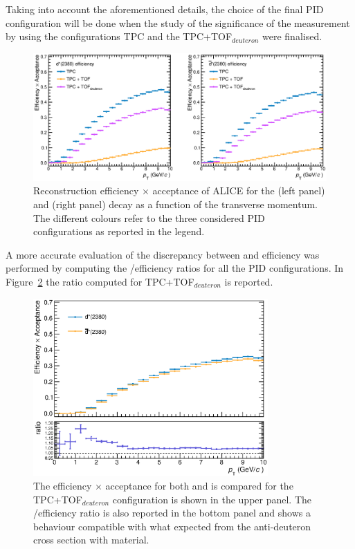 Taking into account the aforementioned details, the choice of the final PID configuration will
be done when the study of the significance of the measurement by using the configurations
TPC and the TPC+TOF$_{deuteron}$ were finalised.

\begin{figure}
    \centering
    \includegraphics[width=\textwidth]{gfx/eff3globalSLIM}
	\caption{Reconstruction efficiency $\times$ acceptance of ALICE for the \ds (left panel) and \dsbar (right panel) decay as a function of the transverse momentum. The different colours refer to the three considered PID configurations as reported in the legend.}
	\label{fig:effAM}
\end{figure}

A more accurate evaluation of the discrepancy between \ds and \dsbar efficiency was performed
by computing the \ds/\dsbar efficiency ratios for all the PID configurations.
In Figure~\ref{fig:eff_ratioAM} the ratio computed for TPC+TOF$_{deuteron}$ is reported.

\begin{figure} [!h]
    \centering
    \includegraphics[width=0.8\textwidth]{gfx/eff_ratioAM1SLIM}
	\caption{The efficiency $\times$ acceptance for both \ds and \dsbar is compared for the TPC+TOF$_{deuteron}$ configuration is shown in the upper panel. The \ds/\dsbar efficiency ratio is also reported in the bottom panel and shows a behaviour compatible with what expected from the anti-deuteron cross section with material.}
	\label{fig:eff_ratioAM}
\end{figure}

